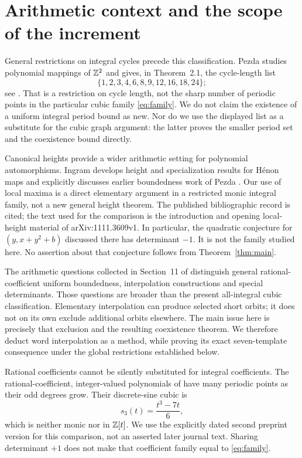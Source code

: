 \section{Arithmetic context and the scope of the increment}
\label{sec:sources}

General restrictions on integral cycles precede this classification.
Pezda studies polynomial mappings of $\mathbb{Z}^2$ and gives, in
Theorem~2.1, the cycle-length list
\[
 \{1,2,3,4,6,8,9,12,16,18,24\};
\]
see \citet{pezda2002cycles}. That is a restriction on cycle length,
not the sharp number of periodic points in the particular cubic
family \eqref{eq:family}. We do not claim the existence of a
uniform integral period bound as new. Nor do we use the displayed
list as a substitute for the cubic graph argument: the latter proves
the smaller period set and the coexistence bound directly.

Canonical heights provide a wider arithmetic setting for polynomial
automorphisms. Ingram develops height and specialization results for
H\'enon maps and explicitly discusses earlier boundedness work of
Pezda \citep{ingram2014canonical}. Our use of local maxima is a direct
elementary argument in a restricted monic integral family, not a new
general height theorem. The published bibliographic record is cited;
the text used for the comparison is the introduction and opening
local-height material of arXiv:1111.3609v1. In particular, the quadratic
conjecture for $(y,x+y^2+b)$ discussed there has determinant $-1$.
It is not the family studied here. No assertion about that conjecture
follows from Theorem~\ref{thm:main}.

The arithmetic questions collected in Section~11 of
\citet{dehenon2024problems} distinguish general rational-coefficient
uniform boundedness, interpolation constructions and special
determinants. Those questions are broader than the present all-integral
cubic classification. Elementary interpolation can produce
selected short orbits; it does not on its own exclude additional
orbits elsewhere. The main issue here is precisely that exclusion
and the resulting coexistence theorem. We therefore deduct word
interpolation as a method, while proving its exact seven-template
consequence under the global restrictions established below.

Rational coefficients cannot be silently substituted for integral
coefficients. The rational-coefficient, integer-valued polynomials
of \citet{kim2025many} have many periodic points as their odd degrees
grow. Their discrete-sine cubic is
\[
 s_3(t)=\frac{t^3-7t}{6},
\]
which is neither monic nor in $\mathbb{Z}[t]$. We use the explicitly dated
second preprint version for this comparison, not an asserted later
journal text. Sharing determinant $+1$ does not make that coefficient
family equal to \eqref{eq:family}.

